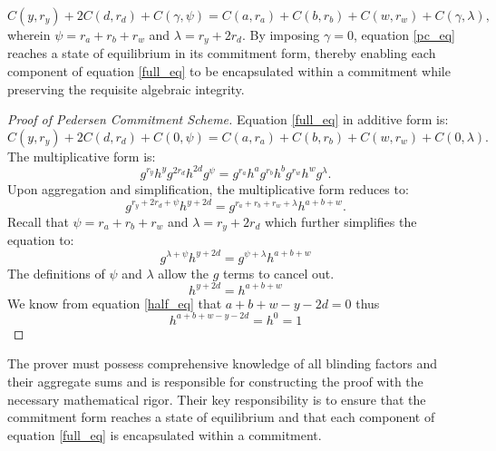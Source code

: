 \documentclass[version=preprint]{iacrcc}
\begin{document}
\begin{equation}
\label{pc_eq}
C(y, r_{y}) + 2 C(d, r_{d}) + C(\gamma, \psi) = C(a, r_{a}) + C(b, r_{b}) + C(w, r_{w}) + C(\gamma, \lambda),
\end{equation}
wherein \( \psi = r_{a} + r_{b} + r_{w} \) and \( \lambda = r_{y} + 2r_{d} \). By imposing \( \gamma = 0 \), equation \ref{pc_eq} reaches a state of equilibrium in its commitment form, thereby enabling each component of equation \ref{full_eq} to be encapsulated within a commitment while preserving the requisite algebraic integrity.

\begin{proof} [Proof of Pedersen Commitment Scheme]
\label{commitment_proof}
Equation \ref{full_eq} in additive form is:
\begin{equation}
C(y, r_{y}) + 2 C(d, r_{d}) + C(0, \psi) = C(a, r_{a}) + C(b, r_{b}) + C(w, r_{w}) + C(0, \lambda).
\end{equation}
The multiplicative form is:
\begin{equation}
g^{r_{y}} h^{y} g^{2 r_{d}} h^{2 d} g^{\psi} = g^{r_{a}} h^{a} g^{r_{b}} h^{b} g^{r_{w}} h^{w} g^{\lambda}.
\end{equation}
Upon aggregation and simplification, the multiplicative form reduces to:
\begin{equation}
\label{full_form}
g^{r_{y} + 2 r_{d} + \psi} h^{y + 2 d}  = g^{r_{a} + r_{b} + r_{w} + \lambda}  h^{a + b + w}.
\end{equation}
Recall that \( \psi = r_{a} + r_{b} + r_{w} \) and \( \lambda = r_{y} + 2r_{d} \) which further simplifies the equation to:
\begin{equation}
g^{\lambda + \psi} h^{y + 2 d}  = g^{\psi + \lambda}  h^{a + b + w}
\end{equation}
The definitions of \( \psi \) and \( \lambda \) allow the \( g \) terms to cancel out.
\begin{equation}
h^{y + 2 d} = h^{a + b + w}
\end{equation}
We know from equation \ref{half_eq} that $a + b + w - y - 2d = 0$ thus
\begin{equation}
h^{a + b + w - y - 2 d} = h^{0} = 1
\end{equation}
\end{proof}

The prover must possess comprehensive knowledge of all blinding factors and their aggregate sums and is responsible for constructing the proof with the necessary mathematical rigor. Their key responsibility is to ensure that the commitment form reaches a state of equilibrium and that each component of equation \ref{full_eq} is encapsulated within a commitment.
\end{document}
